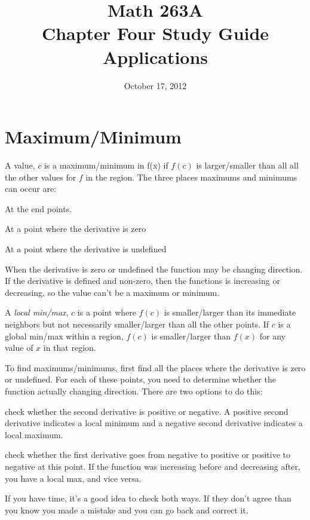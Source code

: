 \documentclass[fleqn]{exam}
\title{Math 263A \\ Chapter Four Study Guide \\ Applications}
\date{October 17, 2012}
\author{}
\begin{document}
\maketitle  

\section{Maximum/Minimum}

A value, $c$ is a maximum/minimum in f(x) if $f(c)$ is larger/smaller than all all the other values for $f$ in the region.
The three places maximums and minimums can occur are:

\begin{itemize*}
\item At the end points.
\item At a point where the derivative is zero
\item At a point where the derivative is undefined
\end{itemize*}

When the derivative is zero or undefined the function may be changing direction.  If the derivative is defined and non-zero, then
the functions is increasing or decreasing, so the value can't be a maximum or minimum.

A {\em local min/max}, $c$ is a point where $f(c)$ is smaller/larger than its immediate neighbors but not necessarily
    smaller/larger than all the other points.  If $c$ is a global min/max within a region, $f(c)$ is smaller/larger than $f(x)$ for 
    any value of $x$ in that region.

To find maximums/minimums, first find all the places where the derivative is zero or undefined.  For each of these
points, you need to determine whether the function actually changing direction.  There are two options to do this:
\begin{itemize*}
    \item check whether the second derivative is positive or negative.  A positive second derivative indicates a local minimum
          and a negative second derivative indicates a local maximum.
    \item check whether the first derivative goes from negative to positive or positive to negative at this
          point.  If the function was increasing before and decreasing after, you have a local max, and vice versa.
\end{itemize*}

If you have time, it's a good idea to check both ways.  If they don't agree than you know you made a mistake and you can
go back and correct it.
\end{document}
